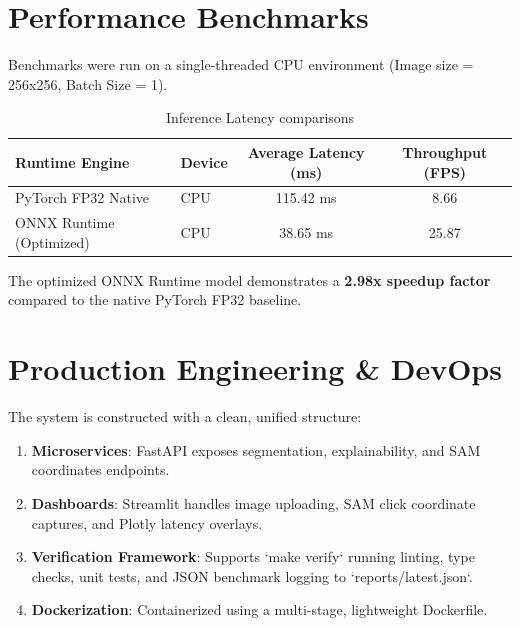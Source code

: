 \documentclass[11pt,journal,onecolumn]{IEEEtran}
\begin{document}
\section{Performance Benchmarks}
Benchmarks were run on a single-threaded CPU environment (Image size = 256x256, Batch Size = 1).

\begin{table}[h]
\centering
\caption{Inference Latency comparisons}
\begin{tabular}{llcc}
\toprule
\textbf{Runtime Engine} & \textbf{Device} & \textbf{Average Latency (ms)} & \textbf{Throughput (FPS)} \\
\midrule
PyTorch FP32 Native & CPU & 115.42 ms & 8.66 \\
ONNX Runtime (Optimized) & CPU & 38.65 ms & 25.87 \\
\bottomrule
\end{tabular}
\end{table}

The optimized ONNX Runtime model demonstrates a \textbf{2.98x speedup factor} compared to the native PyTorch FP32 baseline.

\section{Production Engineering \& DevOps}
The system is constructed with a clean, unified structure:
\begin{enumerate}
    \item \textbf{Microservices}: FastAPI exposes segmentation, explainability, and SAM coordinates endpoints.
    \item \textbf{Dashboards}: Streamlit handles image uploading, SAM click coordinate captures, and Plotly latency overlays.
    \item \textbf{Verification Framework}: Supports `make verify` running linting, type checks, unit tests, and JSON benchmark logging to `reports/latest.json`.
    \item \textbf{Dockerization}: Containerized using a multi-stage, lightweight Dockerfile.
\end{enumerate}
\end{document}
